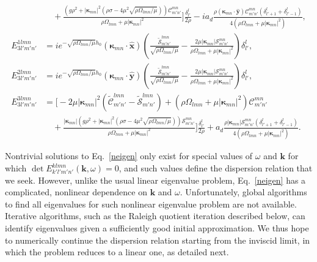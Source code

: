 \documentclass[aps,pre,amsmath,amssymb,floatfix,onecolumn,notitlepage,10pt]{revtex4-1}
\begin{document}
\begin{align}
&\quad + \frac{\left(g \rho ^2+\left\lvert \bm{\kappa}_{m n} \right\rvert^2 \left(\rho  \sigma -4 \mu ^2 \sqrt{{\rho  \Omega _{l m n}}/{\mu }}\right)\right)\mathcal{C}_{m' n'}^{m n} }{\rho  \Omega _{l m n}+\mu  \left\lvert \bm{\kappa}_{m n} \right\rvert^2} \Bigg] \frac{\delta^l_{l'}}{2\rho} - i a_d \frac{\rho \left( \bm{\kappa}_{mn}\cdot\hat{\mathbf{y}} \right) \mathcal{C}_{m' n'}^{m n} \left(\delta^l_{l'+1}+\delta^l_{l'-1}\right)}{4\left(\rho  \Omega _{l m n}+\mu  \left\lvert \bm{\kappa}_{m n} \right\rvert^2\right)}, \\
E_{3l'm'n'}^{1lmn} &=i e^ {-\sqrt{{\rho  \Omega _{l m n}}/{\mu }}h_0} \left( \bm{\kappa}_{mn}\cdot\hat{\mathbf{x}} \right) \left(\frac{\tilde{\mathcal{S}}_{m' n'}^{l m n}}{\sqrt{{\rho  \Omega _{l m n}}/{\mu }}}-\frac{2 \mu  \left\lvert \bm{\kappa}_{m n} \right\rvert \mathcal{S}_{m' n'}^{m n}}{\rho  \Omega _{l m n}+\mu  \left\lvert \bm{\kappa}_{m n} \right\rvert^2}\right) \delta^l_{l'},  \\
E_{3l'm'n'}^{2lmn} &=i e^ {-\sqrt{{\rho  \Omega _{l m n}}/{\mu }}h_0} \left( \bm{\kappa}_{mn}\cdot\hat{\mathbf{y}} \right) \left(\frac{\tilde{\mathcal{S}}_{m' n'}^{l m n}}{\sqrt{{\rho  \Omega _{l m n}}/{\mu }}}-\frac{2 \mu  \left\lvert \bm{\kappa}_{m n} \right\rvert \mathcal{S}_{m' n'}^{m n}}{\rho  \Omega _{l m n}+\mu  \left\lvert \bm{\kappa}_{m n} \right\rvert^2}\right) \delta^l_{l'}, \\
E_{3l'm'n'}^{3lmn} &= \Bigg[ -2 \mu  \left\lvert \bm{\kappa}_{m n} \right\rvert^2 \left( \tilde{\mathcal{C}}_{m' n'}^{l m n}  - \tilde{\mathcal{S}}_{m' n'}^{l m n} \right) + \left(\rho  \Omega _{l m n}+\mu  \left\lvert \bm{\kappa}_{m n} \right\rvert^2\right) \mathcal{C}_{m' n'}^{m n}  \nonumber \\
&\quad+\frac{\left\lvert \bm{\kappa}_{m n} \right\rvert \left(g \rho ^2+\left\lvert \bm{\kappa}_{m n} \right\rvert^2 \left(\rho  \sigma -4 \mu ^2 \sqrt{{\rho  \Omega _{l m n}}/{\mu }}\right)\right) \mathcal{S}_{m' n'}^{m n}  }{\rho  \Omega _{l m n}+\mu  \left\lvert \bm{\kappa}_{m n} \right\rvert^2}\Bigg]  \frac{\delta^l_{l'}}{2\rho} +a_d\frac{\rho \left\lvert \bm{\kappa}_{m n} \right\rvert \mathcal{S}_{m' n'}^{m n} \left(\delta^l_{l'+1}+\delta^l_{l'-1}\right)}{4\left(\rho  \Omega _{l m n}+\mu  \left\lvert \bm{\kappa}_{m n} \right\rvert^2\right)}.
\end{align}

Nontrivial solutions to Eq.~\eqref{neigen} only exist for special values of $\omega$ and $\mathbf{k}$ for which $\det E_{k'l'm'n'}^{klmn}(\mathbf{k},\omega)=0$, and such values define the dispersion relation that we seek. However, unlike the usual linear eigenvalue problem, Eq.~\eqref{neigen} has a complicated, nonlinear dependence on $\mathbf{k}$ and $\omega$. Unfortunately, global algorithms to find all eigenvalues for such nonlinear eigenvalue problem are not available. Iterative algorithms, such as the Raleigh quotient iteration described below, can identify eigenvalues given a sufficiently good initial approximation. We thus hope to numerically continue the dispersion relation starting from the inviscid limit, in which the problem reduces to a linear one, as detailed next.
\end{document}
